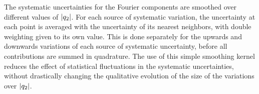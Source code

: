 The systematic uncertainties for the Fourier components are smoothed over different values of $|q_{2}|$. For each source of systematic variation, the uncertainty at each point is averaged with the uncertainty of its nearest neighbors, with double weighting given to its own value. This is done separately for the upwards and downwards variations of each source of systematic uncertainty, before all contributions are summed in quadrature. The use of this simple smoothing kernel reduces the effect of statistical fluctuations in the systematic uncertainties, without drastically changing the qualitative evolution of the size of the variations over $|q_{2}|$.
